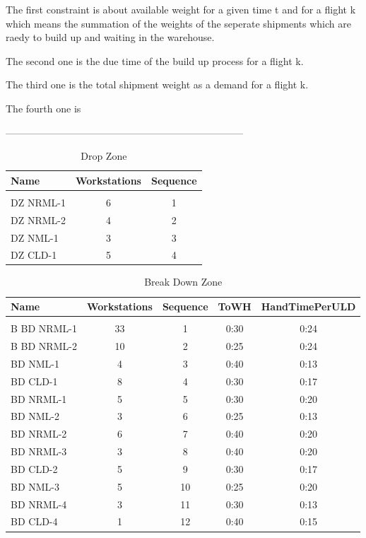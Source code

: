 \documentclass[11pt,a4paper,fleqn]{article}
\begin{document}
The first constraint is about available weight for a given time t and for a flight k which means the summation of the weights of the seperate shipments which are raedy to build up and waiting in the warehouse.


The second one is the due time of the build up process for a flight k.

The third one is the total shipment weight as a demand for a flight k.

The fourth one is 

------------------------------------------------------------------------

\pagebreak

\begin{table}[h!]
	\begin{center}
		\caption{Drop Zone}
		\label{tab:table1}
		\begin{tabular}{l|c|c} %
			\textbf{Name} & \textbf{Workstations} & \textbf{Sequence}\\
			\hline
			& & \\
			DZ NRML-1 & 6 & 1\\
			DZ NRML-2 & 4 & 2\\
			DZ NML-1 & 3 & 3\\
			DZ CLD-1 & 5 & 4\\
		\end{tabular}
	\end{center}
\end{table}

\begin{table}[h!]
	\begin{center}
		\caption{Break Down Zone}
		\label{tab:table1}
		\begin{tabular}{l|c|c|c|c} %
			\textbf{Name} & \textbf{Workstations} & \textbf{Sequence} & \textbf{ToWH} & \textbf{HandTimePerULD}\\
			\hline
			& & & & \\
			B BD NRML-1 & 33 & 1 & 0:30 & 0:24\\
			B BD NRML-2 & 10 & 2 &  0:25 & 0:24\\
			BD NML-1 & 4 & 3 &  0:40 & 0:13\\
			BD CLD-1 & 8 & 4  &  0:30 & 0:17\\
			BD NRML-1 & 5 & 5  &  0:30 & 0:20\\
			BD NML-2 & 3 & 6  & 0:25 & 0:13\\
			BD NRML-2 & 6 & 7  & 0:40 & 0:20\\
			BD NRML-3 & 3 & 8  & 0:40 & 0:20\\
			BD CLD-2 & 5 & 9  & 0:30 & 0:17\\
			BD NML-3 & 5 & 10  & 0:25 & 0:20\\
			BD NRML-4 & 3 & 11  & 0:30 & 0:13\\
			BD CLD-4 & 1 & 12  & 0:40 & 0:15\\
		\end{tabular}
	\end{center}
\end{table}
\end{document}
